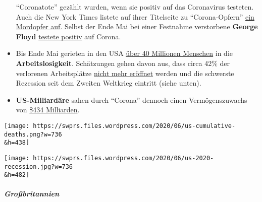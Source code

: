 \begin{itemize}
  ``Coronatote'' gezählt wurden, wenn sie positiv auf das Coronavirus
  testeten. Auch die New York Times listete auf ihrer Titelseite zu
  ``Corona-Opfern''
  \href{https://www.washingtontimes.com/news/2020/may/24/new-york-times-lists-homicide-victim-coronavirus-d/}{ein
  Mordopfer auf}. Selbst der Ende Mai bei einer Festnahme verstorbene
  \textbf{George Floyd}
  \href{https://www.nydailynews.com/coronavirus/ny-coronavirus-george-floyd-20200604-pvhrtjn4mna5blzow3gfx5ag3y-story.html}{testete
  positiv} auf Corona.
\item
  Bis Ende Mai gerieten in den USA
  \href{https://www.businessinsider.com/us-weekly-jobless-claims-unemployment-filings-coronavirus-labor-market-layoffs-2020-5}{über
  40 Millionen Menschen} in die \textbf{Arbeitslosigkeit}. Schätzungen
  gehen davon aus, dass circa 42\% der verlorenen Arbeitsplätze
  \href{https://www.forbes.com/sites/kenrapoza/2020/05/15/some-42-of-jobs-lost-in-pandemic-are-gone-for-good/}{nicht
  mehr eröffnet} werden und die schwerste Rezession seit dem Zweiten
  Weltkrieg eintritt (siehe unten).
\item
  \textbf{US-Milliardäre} sahen durch ``Corona'' dennoch einen
  Vermögenszuwachs von
  \href{https://www.cnbc.com/2020/05/21/american-billionaires-got-434-billion-richer-during-the-pandemic.html}{\$434
  Milliarden}.
\end{itemize}

\texttt{[image: https://swprs.files.wordpress.com/2020/06/us-cumulative-deaths.png?w=736\\\&h=438]}

\texttt{[image: https://swprs.files.wordpress.com/2020/06/us-2020-recession.jpg?w=736\\\&h=482]}

\hypertarget{grouxdfbritannien-1}{%
\subparagraph{\texorpdfstring{\textbf{Großbritannien}}{Großbritannien}}\label{grouxdfbritannien-1}}

